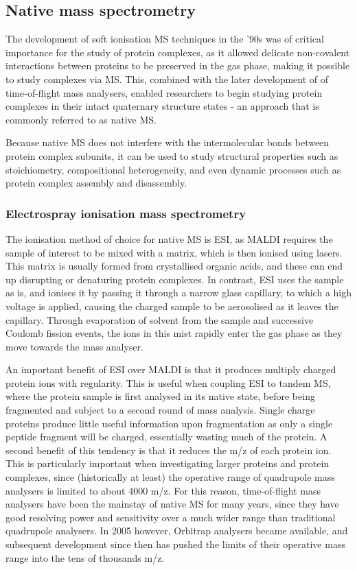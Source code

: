 \documentclass[a4paper,11pt,twoside,openright]{scrbook}
\begin{document}
\subsection{Native mass spectrometry}
The development of soft ionisation MS techniques in the '90s was of critical importance for the study of protein complexes, as it allowed delicate non-covalent interactions between proteins to be preserved in the gas phase, making it possible to study complexes via MS. This, combined with the later development of of time-of-flight mass analysers, enabled researchers to begin studying protein complexes in their intact quaternary structure states - an approach that is commonly referred to as native MS.

Because native MS does not interfere with the intermolecular bonds between protein complex subunits, it can be used to study structural properties such as stoichiometry, compositional heterogeneity, and even dynamic processes such as protein complex assembly and disassembly.

\subsubsection{Electrospray ionisation mass spectrometry}
The ionisation method of choice for native MS is ESI, as MALDI requires the sample of interest to be mixed with a matrix, which is then ionised using lasers. This matrix is usually formed from crystallised organic acids, and these can end up disrupting or denaturing protein complexes. In contrast, ESI uses the sample as is, and ionises it by passing it through a narrow glass capillary, to which a high voltage is applied, causing the charged sample to be aerosolised as it leaves the capillary. Through evaporation of solvent from the sample and successive Coulomb fission events, the ions in this mist rapidly enter the gas phase as they move towards the mass analyser.

An important benefit of ESI over MALDI is that it produces multiply charged protein ions with regularity. This is useful when coupling ESI to tandem MS, where the protein sample is first analysed in its native state, before being fragmented and subject to a second round of mass analysis. Single charge proteins produce little useful information upon fragmentation as only a single peptide fragment will be charged, essentially wasting much of the protein. A second benefit of this tendency is that it reduces the m/z of each protein ion. This is particularly important when investigating larger proteins and protein complexes, since (historically at least) the operative range of quadrupole mass analysers is limited to about 4000 m/z. For this reason, time-of-flight mass analysers have been the mainstay of native MS for many years, since they have good resolving power and sensitivity over a much wider range than traditional quadrupole analysers. In 2005 however, Orbitrap analysers became available, and subsequent development since then has pushed the limits of their operative mass range into the tens of thousands m/z.
\end{document}
